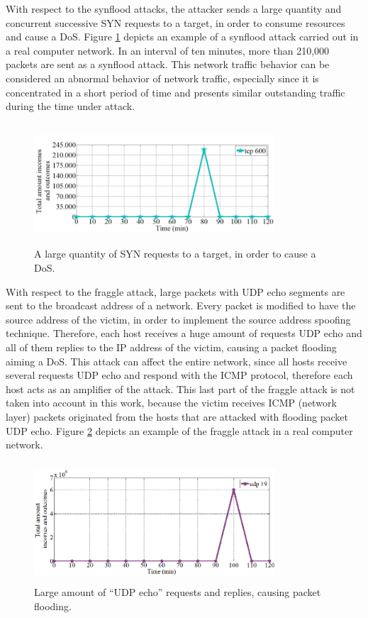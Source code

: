 \documentclass[review]{elsarticle}
\begin{document}
With respect to the synflood attacks, the attacker sends a large quantity and concurrent successive SYN requests to a target, in order to consume resources and cause a DoS. Figure \ref{fig:fig5} depicts an example of a synflood attack carried out in a real computer network. In an interval of ten minutes, more than 210,000 packets are sent as a synflood attack. This network traffic behavior can be considered an abnormal behavior of network traffic, especially since it is concentrated in a short period of time and presents similar outstanding traffic during the time under attack.

\begin{figure}[h!]
     \centering 
     \includegraphics[height=4.5cm, width=9cm]{results/figures/fig05.png}
     \caption{A large quantity of SYN requests to a target, in order to cause a DoS.}
     \label{fig:fig5}
\end{figure}

With respect to the fraggle attack, large packets with UDP echo segments are sent to the broadcast address of a network. Every packet is modified to have the source address of the victim, in order to implement the source address spoofing technique. Therefore, each host receives a huge amount of requests UDP echo and all of them replies to the IP address of the victim, causing a packet flooding aiming a DoS. This attack can affect the entire network, since all hosts receive several requests UDP echo and respond with the ICMP protocol, therefore each host acts as an amplifier of the attack. This last part of the fraggle attack is not taken into account in this work, because the victim receives ICMP (network layer) packets originated from the hosts that are attacked with flooding packet UDP echo. Figure \ref{fig:fig6} depicts an example of the fraggle attack in a real computer network. 

\begin{figure}[h!]
     \centering 
     \includegraphics[height=4.5cm, width=9cm]{results/figures/fig06.png}
     \caption{Large amount of “UDP echo” requests and replies, causing packet flooding.}
     \label{fig:fig6}
\end{figure}
\end{document}
